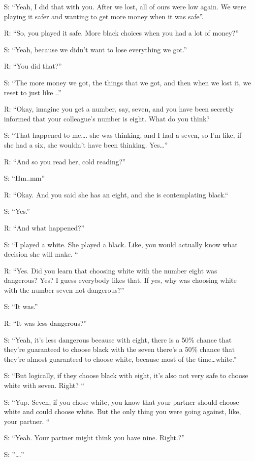 S: “Yeah, I did that with you. After we lost, all of ours were low again. We were playing it safer and wanting to get more money when it was safe”.

R: “So, you played it safe. More black choices when you had a lot of money?”

S: “Yeah, because we didn't want to lose everything we got.”
 
R: “You did that?”

S: “The more money we got, the things that we got, and then when we lost it, we reset to just like ..”

R: “Okay, imagine you get a number, say, seven, and you have been secretly informed that your colleague's number is eight. What do you think?

S: “That happened to me…. she was thinking, and I had a seven, so I'm like, if she had a six, she wouldn't have been thinking. Yes…” 

R: “And so you read her, cold reading?”

S: “Hm..mm”


R: “Okay. And you said she has an eight, and she is contemplating black.“

S: “Yes.”

R: “And what happened?”

S: “I played a white. She played a black. Like, you would actually know what decision she will make. “

R: “Yes. Did you learn that choosing white with the number eight was dangerous? Yes? I guess everybody likes that. If yes, why was choosing white with the number seven not dangerous?”

S: “It was.”

R: “It was less dangerous?”

S: “Yeah, it's less dangerous because with eight, there is a 50\% chance that they're guaranteed to choose black with the seven there's a 50\% chance that they're almost guaranteed to choose white, because most of the time…white.”

S: “But logically, if they choose black with eight, it's also not very safe to choose white with seven. Right? “

S: “Yup. Seven, if you chose white, you know that your partner should choose white and could choose white. But the only thing you were going against, like, your partner. “

S: “Yeah. Your partner might think you have nine. Right.?”

S: ”….”

